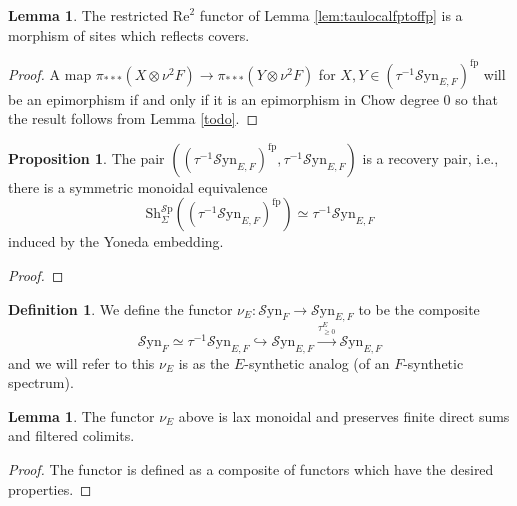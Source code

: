 \documentclass[10pt]{amsart}
\theoremstyle{definition}
\numberwithin{figure}{section}
\numberwithin{equation}{section}
\newtheorem{lemma}[figure]{Lemma}
\newtheorem{proposition}[figure]{Proposition}
\newtheorem{definition}[figure]{Definition}
\theoremstyle{cited}
\newcommand{\Sp}{{\mathcal{S}\mathrm{p}}}
\newcommand{\Sh}{\mathrm{Sh}}
\newcommand{\fp}{\mathrm{fp}}
\newcommand{\Syn}{\mathcal{S}\mathrm{yn}}
\renewcommand{\Re}{\mathrm{Re}}
\begin{document}
\begin{lemma}
  The restricted $\Re^2$ functor of Lemma \ref{lem:taulocalfptoffp} is a morphism of sites which reflects covers.
\end{lemma}

\begin{proof}
  A map $\pi_{***}(X\otimes \nu^2 F)\to \pi_{***}(Y\otimes \nu^2 F)$ for $X,Y\in (\tau^{-1}\Syn_{E,F})^\fp$ will be an epimorphism if and only if it is an epimorphism in Chow degree $0$ so that the result follows from Lemma \ref{todo}. 
\end{proof}



\begin{proposition}
  The pair $((\tau^{-1}\Syn_{E,F})^\fp, \tau^{-1}\Syn_{E,F})$ is a recovery pair, i.e., there is a symmetric monoidal equivalence 
  \[
    \Sh_{\Sigma}^\Sp((\tau^{-1}\Syn_{E,F})^\fp)\simeq \tau^{-1}\Syn_{E,F}
  \]
  induced by the Yoneda embedding.
\end{proposition}

\begin{proof}
\end{proof}

\begin{definition}
  We define the functor $\nu_E:\Syn_{F}\to \Syn_{E,F}$ to be the composite
  \[
  \Syn_{F}\simeq \tau^{-1}\Syn_{E,F} \hookrightarrow \Syn_{E,F}\xrightarrow{\tau^E_{\geq 0}}\Syn_{E,F}
  \]
  and we will refer to this $\nu_E$ is as the $E$-synthetic analog (of an $F$-synthetic spectrum).
\end{definition}

\begin{lemma}
  The functor $\nu_E$ above is lax monoidal and preserves finite direct sums and filtered colimits.
\end{lemma}

\begin{proof}
    The functor is defined as a composite of functors which have the desired properties.
\end{proof}
\end{document}
